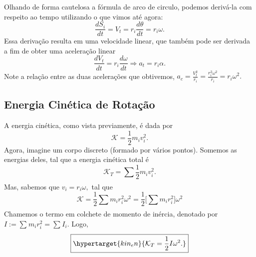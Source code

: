 \documentclass[PhysicsII/physicsII_notes.tex]{subfiles}
\begin{document}
Olhando de forma cautelosa a fórmula de arco de circulo, podemos derivá-la com respeito ao tempo utilizando o que vimos até agora:
\[
	\frac{dS_{i}}{dt} = V_{t} = r_{i}\frac{d\theta }{dt} = r_{i}\omega.
\]
Essa derivação resulta em uma velocidade linear, que também pode ser derivada a fim de obter uma aceleração linear
\[
	\frac{dV_{t}}{dt} = r_{i}\frac{d\omega }{dt} \Rightarrow a_{t} = r_{i}\alpha.
\]
Note a relação entre as duas acelerações que obtivemos, \(a_{c} = \frac{V_{t}^{2}}{r_{i}}= \frac{r_{i}^{2}\omega^{2}}{r_{i}} = r_{i}\omega^{2}.\)

\subsection{Energia Cinética de Rotação}
A energia cinética, como vista previamente, é dada por
\[
	\mathcal{K} = \frac{1}{2}m_{i}v_{i}^{2}.
\]
Agora, imagine um corpo discreto (formado por vários pontos). Somemos as energias deles, tal que a energia cinética total é
\[
	\mathcal{K}_{T} = \sum\limits_{}^{}\frac{1}{2}m_{i}v_{i}^{2}.
\]
Mas, sabemos que \(v_{i} = r_{i}\omega, \) tal que
\[
	\mathcal{K} = \frac{1}{2}\sum\limits_{}^{}m_{i}r_{i}^{2}\omega^{2} = \frac{1}{2}\biggl[\sum\limits_{}^{}m_{i}r_{i}^{2}\biggr]\omega^{2}
\]
Chamemos o termo em colchete de momento de inércia, denotado por \(I:= \sum\limits_{}^{}m_{i}r_{i}^{2} = \sum\limits_{}^{}I_{i}\). Logo,
\[
	\boxed{\hypertarget{kin_en}{\mathcal{K}_{T} = \frac{1}{2}I\omega^{2}.}}
\]
\end{document}
